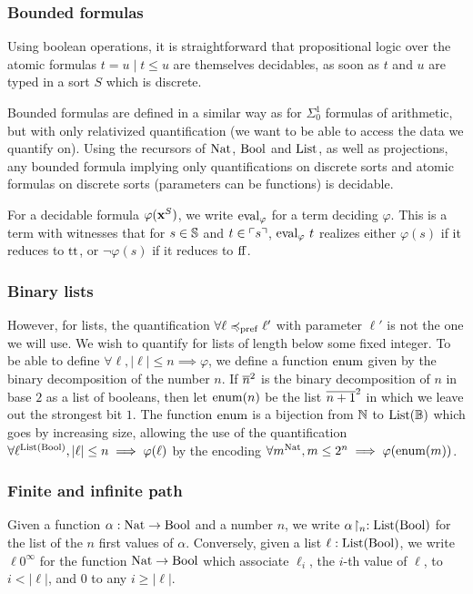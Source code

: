 \documentclass[a4paper,UKenglish,cleveref, autoref, thm-restate]{lipics-v2021}
\begin{document}
\subsubsection{Bounded formulas}

Using boolean operations, it is straightforward that propositional logic over the atomic formulas
$t = u \mid t \leq u$
are themselves decidables, as soon as $t$ and $u$ are typed in a sort $S$ which is discrete.

Bounded formulas are defined in a similar way as for $\Sigma_0^1$ formulas of arithmetic, but with only relativized quantification (we want to be able to access the data we quantify on).  Using the recursors of $\mathrm{Nat}$, $\mathrm{Bool}$ and $\mathrm{List}$, as well as projections, any bounded formula implying only quantifications on discrete sorts and atomic formulas on discrete sorts (parameters can be functions) is decidable.

For a decidable formula $\varphi(\mathbf{x}^S)$, we write $\mathrm{eval}_\varphi$ for a term deciding $\varphi$. This is a term with witnesses that for $s \in \mathbb S$ and $t \in \ulcorner s\urcorner$, $\mathrm{eval}_\varphi\ t$ realizes either
$\varphi(s)$ if it reduces to $\mathrm{tt}$, or $\lnot\varphi(s)$ if it reduces to $\mathrm{ff}$.

\subsubsection{Binary lists}

However, for lists, the quantification $\forall \ell \preccurlyeq_{\mathrm{pref}} \ell'$ with parameter $\ell'$ is not the one we will use. We wish to quantify for lists of length below some fixed integer. To be able to define $\forall \ell, |\ell| \leq n \implies \varphi$, we define a function $\mathrm{enum}$ given by the binary decomposition of the number $n$. If $\overline{n}^{2}$ is the binary decomposition of $n$ in base $2$ as a list of booleans, then let $\mathrm{enum}(n)$ be the list $\overline{n+1}^{2}$ in which we leave out the strongest bit $1$. The function $\mathrm{enum}$ is a bijection from $\mathbb N$ to $\mathrm{List}(\mathbb B)$ which goes by increasing size, allowing the use of the quantification
$\forall \ell^{\mathrm{List}(\mathrm{Bool})}, |\ell| \leq n \implies \varphi(\ell)$
by the encoding
$\forall m^{\mathrm{Nat}}, m \leq 2^n \implies \varphi(\mathrm{enum}(m))$.

\subsubsection{Finite and infinite path}

Given a function $\alpha : \mathrm{Nat} \to \mathrm{Bool}$ and a number $n$, we write ${\alpha}\!\upharpoonright_{n} : \mathrm{List}(\mathrm{Bool})$ for the list of the $n$ first values of $\alpha$. Conversely, given a list $\ell : \mathrm{List}(\mathrm{Bool})$, we write $\ell0^\infty$ for the function $\mathrm{Nat} \to \mathrm{Bool}$ which associate $\ell_i$, the $i$-th value of $\ell$, to $i < |\ell|$, and $0$ to any $i \geq |\ell|$.
\end{document}
